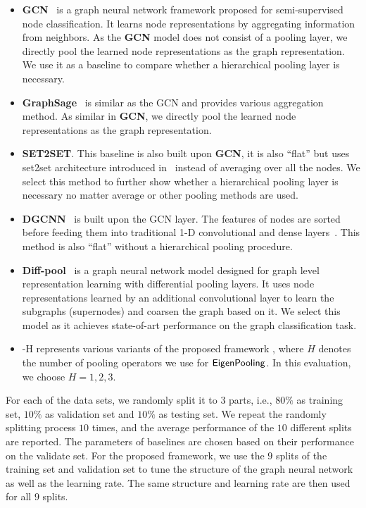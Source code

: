 \documentclass[sigconf]{acmart}
\newcommand{\m}{{\sf {EigenGCN}}}
\newcommand{\pooling}{{\sf {EigenPooling}}}
\begin{document}
\begin{itemize}
    \item {\bf GCN}~\cite{kipf2016semi} is a graph neural network framework proposed for semi-supervised node classification. It learns node representations by aggregating information from neighbors. As the {\bf GCN} model does not consist of a pooling layer, we directly pool the learned node representations as the graph representation. We use it as a baseline to compare whether a hierarchical pooling layer is necessary. 
    \item {\bf GraphSage}~\cite{hamilton2017inductive} is similar as the GCN and provides various aggregation method. As similar in {\bf GCN}, we directly pool the learned node representations as the graph representation. 
    \item {\bf SET2SET}. This baseline is also built upon {\bf GCN}, it is also ``flat'' but uses set2set architecture introduced in~\cite{vinyals2015order} instead of averaging over all the nodes. We select this method to further show whether a hierarchical pooling layer is necessary no matter average or other pooling methods are used. 
    \item {\bf DGCNN}~\cite{zhang2018end} is built upon the GCN layer. The features of nodes are sorted before feeding them into traditional 1-D convolutional and dense layers~\cite{zhang2018end}. This method is also ``flat'' without a hierarchical pooling procedure. 
    \item {\bf Diff-pool}~\cite{ying2018hierarchical} is a graph neural network model designed for graph level representation learning with differential pooling layers. It uses node representations learned by an additional convolutional layer to learn the subgraphs (supernodes) and coarsen the graph based on it. We select this model as it achieves state-of-art performance on the graph classification task.
    \item \m-H represents various variants of the proposed framework \m, where $H$ denotes the number of pooling operators we use for $\pooling$. In this evaluation, we choose $H=1,2,3$.
\end{itemize}

For each of the data sets, we randomly split it to $3$ parts, i.e., $80\%$ as training set, $10\%$ as validation set and $10\%$ as testing set. We repeat the randomly splitting process $10$ times, and the average performance of the $10$ different splits are reported. The parameters of baselines are chosen based on their performance on the validate set.  For the proposed framework, we use the $9$ splits of the training set and validation set to tune the structure of the graph neural network as well as the learning rate. The same structure and learning rate are then used for all $9$ splits. 
\end{document}
